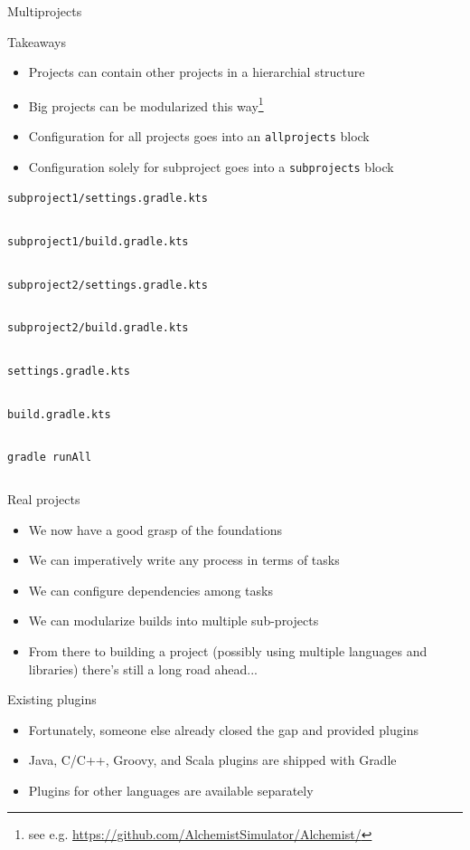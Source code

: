 \documentclass[presentation]{beamer}
\newcommand{\codefile}[4]{
	\begin{block}{\texttt{#2}}
		\inputminted[fontsize=#3,linenos=true,breaklines=true]{#4}{"workspace/#1/#2"}
	\end{block}
}
\newcommand{\kotlin}[3]{\codefile{#1}{#2}{#3}{kotlin}}
\newcommand{\terminal}[3]{\codefile{#1}{#2}{#3}{text}}
\begin{document}
\begin{frame}{Multiprojects}
    \begin{block}{Takeaways}
        \begin{itemize}
            \item Projects can contain other projects in a hierarchial structure
            \item Big projects can be modularized this way\footnote{see e.g. \url{https://github.com/AlchemistSimulator/Alchemist/}}
            \item Configuration for all projects goes into an \texttt{allprojects} block
            \item Configuration solely for subproject goes into a \texttt{subprojects} block
        \end{itemize}
    \end{block}
    \kotlin{12-Multiproject}{subproject1/settings.gradle.kts}{\scriptsize}
    \kotlin{12-Multiproject}{subproject1/build.gradle.kts}{\scriptsize}
    \kotlin{12-Multiproject}{subproject2/settings.gradle.kts}{\scriptsize}
    \kotlin{12-Multiproject}{subproject2/build.gradle.kts}{\scriptsize}
    \kotlin{12-Multiproject}{settings.gradle.kts}{\scriptsize}
    \kotlin{12-Multiproject}{build.gradle.kts}{\scriptsize}
    \terminal{12-Multiproject}{gradle runAll}{\scriptsize}
\end{frame}

\begin{frame}[fragile]{Real projects}
    \begin{itemize}
        \item We now have a good grasp of the foundations
        \item We can imperatively write any process in terms of tasks
        \item We can configure dependencies among tasks
        \item We can modularize builds into multiple sub-projects
        \item From there to building a project (possibly using multiple languages and libraries) there's still a long road ahead...
    \end{itemize}
    \begin{block}{Existing plugins}
        \begin{itemize}
            \item Fortunately, someone else already closed the gap and provided plugins
            \item Java, C/C++, Groovy, and Scala plugins are shipped with Gradle
            \item Plugins for other languages are available separately
        \end{itemize}
    \end{block}
\end{frame}
\end{document}
